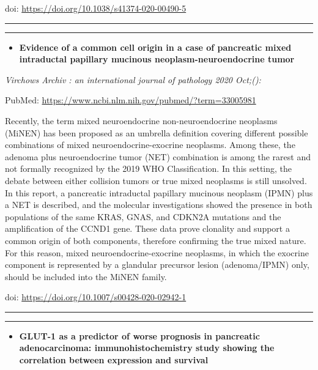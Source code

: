 \documentclass[
]{article}
\providecommand{\tightlist}{%
  \setlength{\itemsep}{0pt}\setlength{\parskip}{0pt}}
\begin{document}
doi: \url{https://doi.org/10.1038/s41374-020-00490-5}

\begin{center}\rule{0.5\linewidth}{0.5pt}\end{center}

\begin{center}\rule{0.5\linewidth}{0.5pt}\end{center}

\begin{itemize}
\tightlist
\item
  \textbf{Evidence of a common cell origin in a case of pancreatic mixed
  intraductal papillary mucinous neoplasm-neuroendocrine tumor}
\end{itemize}

\emph{Virchows Archiv : an international journal of pathology 2020
Oct;():}

PubMed: \url{https://www.ncbi.nlm.nih.gov/pubmed/?term=33005981}

Recently, the term mixed neuroendocrine non-neuroendocrine neoplasms
(MiNEN) has been proposed as an umbrella definition covering different
possible combinations of mixed neuroendocrine-exocrine neoplasms. Among
these, the adenoma plus neuroendocrine tumor (NET) combination is among
the rarest and not formally recognized by the 2019 WHO Classification.
In this setting, the debate between either collision tumors or true
mixed neoplasms is still unsolved. In this report, a pancreatic
intraductal papillary mucinous neoplasm (IPMN) plus a NET is described,
and the molecular investigations showed the presence in both populations
of the same KRAS, GNAS, and CDKN2A mutations and the amplification of
the CCND1 gene. These data prove clonality and support a common origin
of both components, therefore confirming the true mixed nature. For this
reason, mixed neuroendocrine-exocrine neoplasms, in which the exocrine
component is represented by a glandular precursor lesion (adenoma/IPMN)
only, should be included into the MiNEN family.

doi: \url{https://doi.org/10.1007/s00428-020-02942-1}

\begin{center}\rule{0.5\linewidth}{0.5pt}\end{center}

\begin{center}\rule{0.5\linewidth}{0.5pt}\end{center}

\begin{itemize}
\tightlist
\item
  \textbf{GLUT-1 as a predictor of worse prognosis in pancreatic
  adenocarcinoma: immunohistochemistry study showing the correlation
  between expression and survival}
\end{itemize}
\end{document}
